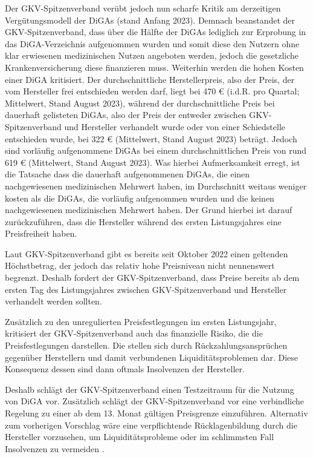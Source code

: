 \documentclass{article}
\begin{document}
			Der GKV-Spitzenverband verübt jedoch nun scharfe Kritik am derzeitigen Vergütungsmodell der DiGAs (stand Anfang 2023). Demnach beanstandet der GKV-Spitzenverband, dass über die Hälfte der DiGAs lediglich zur Erprobung in das DiGA-Verzeichnis aufgenommen wurden und somit diese den Nutzern ohne klar erwiesenen medizinischen Nutzen angeboten werden, jedoch die gesetzliche Krankenversicherung diese finanzieren muss. Weiterhin werden die hohen Kosten einer DiGA kritisiert. Der durchschnittliche Herstellerpreis, also der Preis, der vom Hersteller frei entschieden werden darf, liegt bei 470 € (i.d.R. pro Quartal; Mittelwert, Stand August 2023), während der durchschnittliche Preis bei dauerhaft gelisteten DiGAs, also der Preis der entweder zwischen GKV-Spitzenverband und Hersteller verhandelt wurde oder von einer Schiedstelle entschieden wurde, bei 322 € (Mittelwert, Stand August 2023) beträgt. Jedoch sind vorläufig aufgenommene DiGAs bei einem durchschnittlichen Preis von rund 619 € (Mittelwert, Stand August 2023). Was hierbei Aufmerksamkeit erregt, ist die Tatsache dass die dauerhaft aufgenommenen DiGAs, die einen nachgewiesenen medizinischen Mehrwert haben, im Durchschnitt weitaus weniger kosten als die DiGAs, die vorläufig aufgenommen wurden und die keinen nachgewiesenen medizinischen Mehrwert haben. Der Grund hierbei ist darauf zurückzuführen, dass die Hersteller während des ersten Listungsjahres eine Preisfreiheit haben.\par    
			Laut GKV-Spitzenverband gibt es bereits seit Oktober 2022 einen geltenden Höchstbetrag, der jedoch das relativ hohe Preisniveau nicht nennenswert begrenzt. Deshalb fordert der GKV-Spitzenverband, dass Preise bereits ab dem ersten Tag des Listungsjahres zwischen GKV-Spitzenverband und Hersteller verhandelt werden sollten.\par 
			Zusätzlich zu den unregulierten Preisfestlegungen im ersten Listungsjahr, kritisiert der GKV-Spitzenverband auch das finanzielle Risiko, die die Preisfestlegungen darstellen. Die stellen sich durch Rückzahlungsansprüchen gegenüber Herstellern und damit verbundenen Liquiditätsproblemen dar. Diese Konsequenz dessen sind dann oftmals Insolvenzen der Hersteller.\par 
			Deshalb schlägt der GKV-Spitzenverband einen Testzeitraum für die Nutzung von DiGA vor. Zusätzlich schlägt der GKV-Spitzenverband vor eine verbindliche Regelung zu einer ab dem 13. Monat gültigen Preisgrenze einzuführen. Alternativ zum vorherigen Vorschlag wäre eine verpflichtende Rücklagenbildung durch die Hersteller vorzusehen, um Liquiditätsprobleme oder im schlimmsten Fall Insolvenzen zu vermeiden \cite[vgl. DiGA-Report: Bilanz der GKV und des Herstellerverbands]{frauenhofinstitut}.    	
			\newpage	     
\end{document}
